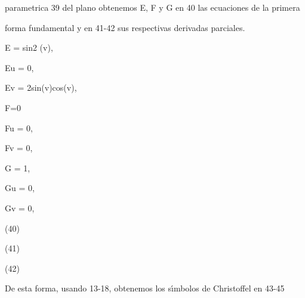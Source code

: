 \documentclass[a4paper,portrait,12pt]{article}
\begin{document}
\begin{flushleft}
parametrica 39 del plano obtenemos E, F y G en 40 las ecuaciones de la primera
\end{flushleft}


\begin{flushleft}
forma fundamental y en 41-42 sus respectivas derivadas parciales.
\end{flushleft}


\begin{flushleft}
E = sin2 (v),
\end{flushleft}


\begin{flushleft}
Eu = 0,
\end{flushleft}


\begin{flushleft}
Ev = 2sin(v)cos(v),
\end{flushleft}





\begin{flushleft}
F=0
\end{flushleft}


\begin{flushleft}
Fu = 0,
\end{flushleft}


\begin{flushleft}
Fv = 0,
\end{flushleft}





\begin{flushleft}
G = 1,
\end{flushleft}


\begin{flushleft}
Gu = 0,
\end{flushleft}


\begin{flushleft}
Gv = 0,
\end{flushleft}





(40)


(41)


(42)





\begin{flushleft}
De esta forma, usando 13-18, obtenemos los s\i{}́mbolos de Christoffel en 43-45
\end{flushleft}
\end{document}
